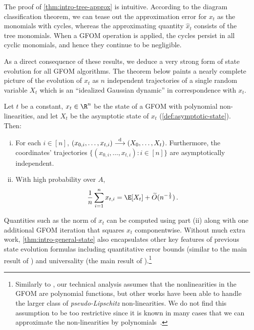 \documentclass[12pt]{article}
\renewcommand{\tod}{\overset{\textnormal{d}}{\longrightarrow}}
\begin{document}
The proof of \cref{thm:intro-tree-approx} is intuitive.
According to the diagram classification theorem,
we can tease out the approximation error for $x_t$ as the monomials with cycles,
whereas the approximating quantity $\widehat{x}_t$ consists of the tree monomials.
When a GFOM operation is applied, the cycles persist in all cyclic monomials,
and hence they continue to be negligible.


As a direct consequence of these results, we deduce a very strong form of state evolution for all GFOM algorithms.
The theorem below paints a nearly complete picture of the evolution of $x_t$
as $n$ independent trajectories of a single random variable $X_t$ which is an ``idealized Gaussian dynamic''
in correspondence with $\widehat{x}_t$.

\begin{theorem}
    \label{thm:intro-general-state}
    Let $t$ be a constant, $x_t\in \R^n$ be the state of a GFOM with polynomial non-linearities, and let $X_t$ be the asymptotic state of $x_t$ (\cref{def:asymptotic-state}). Then:
    \begin{enumerate}[(i)]
        \item For each $i \in [n]$, $(x_{0,i}, \dots, x_{t,i}) \tod (X_0, \dots, X_t)$.
        Furthermore, the coordinates' trajectories $\{(x_{0,i},\dots, x_{t,i}) : i \in [n]\}$ are asymptotically independent.
        \item With high probability over $A$,
    \[
        \frac{1}{n} \sum_{i = 1}^n x_{t,i} = \E[X_t] + \widetilde{O}(n^{-\frac 1 2})\,.
    \]
    \end{enumerate}
\end{theorem}
Quantities such as the norm of $x_t$ can be computed using part (ii)
along with one additional GFOM iteration that squares $x_t$ componentwise.
Without much extra work, \cref{thm:intro-general-state} also encapsulates other key features of previous state evolution formulas including quantitative error bounds (similar to the main result of \cite{rush2018finite}) and universality (the main result of \cite{bayati2015universality}).\footnote{Similarly to \cite{bayati2015universality}, our technical analysis assumes that the nonlinearities in the GFOM are polynomial functions, but other works have been able to handle the larger class of \emph{pseudo-Lipschitz} non-linearities. We do not find this
assumption to be too restrictive since
it is known in many cases that we can approximate the non-linearities 
by polynomials~\cite[Appendix B]{ivkov2023semidefinite}.}
\end{document}
